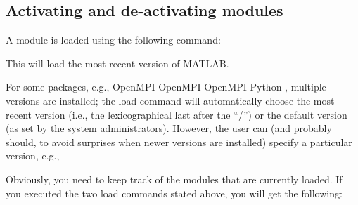 \subsection{Activating and de-activating modules}
\label{subsec:activating-and-deactivating-modules}

A module is loaded using the following command:

\ifantwerpen
\begin{prompt}
\end{prompt}
\fi
\ifbrussel
\begin{prompt}
\end{prompt}
\fi
\ifgent
\begin{prompt}
\end{prompt}
\fi
\ifleuven
\begin{prompt}
\end{prompt}
\fi

This will load the most recent version of MATLAB.

For some packages, e.g.,
\ifantwerpen
OpenMPI
\fi
\ifbrussel
OpenMPI
\fi
\ifgent
OpenMPI
\fi
\ifleuven
Python
\fi
, multiple versions are installed; the load
command will automatically choose the most recent version (i.e., the
lexicographical last after the ``/'') or the default version (as set by the
system administrators). However, the user can (and probably should, to avoid
surprises when newer versions are installed) specify a particular version,
e.g.,

\ifantwerpen
\begin{prompt}
\end{prompt}
\fi
\ifbrussel
\begin{prompt}
\end{prompt}
\fi
\ifgent
\begin{prompt}
\end{prompt}
\fi
\ifleuven
\begin{prompt}
\end{prompt}
\fi

Obviously, you need to keep track of the modules that are currently
loaded. If you executed the two load commands stated above, you will get the
following:

